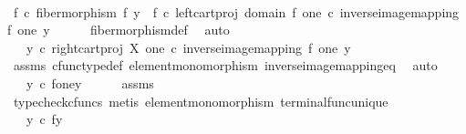 \begin{isabellebody}
%
\isatagproof
{}\isamarkupfalse%
\ {\isacharminus}{\kern0pt}\isanewline
\ \ \isamarkupfalse%
\ {\isachardoublequoteopen}f\ {\isasymcirc}\isactrlsub c\ fiber{\isacharunderscore}{\kern0pt}morphism\ f\ y\ {\isacharequal}{\kern0pt}\ f\ {\isasymcirc}\isactrlsub c\ left{\isacharunderscore}{\kern0pt}cart{\isacharunderscore}{\kern0pt}proj\ {\isacharparenleft}{\kern0pt}domain\ f{\isacharparenright}{\kern0pt}\ one\ {\isasymcirc}\isactrlsub c\ inverse{\isacharunderscore}{\kern0pt}image{\isacharunderscore}{\kern0pt}mapping\ f\ one\ y{\isachardoublequoteclose}\isanewline
\ \ \ \ \isamarkupfalse%
\ fiber{\isacharunderscore}{\kern0pt}morphism{\isacharunderscore}{\kern0pt}def\ \isamarkupfalse%
\ auto\isanewline
\ \ \isamarkupfalse%
\ \isamarkupfalse%
\ {\isachardoublequoteopen}{\isachardot}{\kern0pt}{\isachardot}{\kern0pt}{\isachardot}{\kern0pt}\ {\isacharequal}{\kern0pt}\ y\ {\isasymcirc}\isactrlsub c\ right{\isacharunderscore}{\kern0pt}cart{\isacharunderscore}{\kern0pt}proj\ X\ one\ {\isasymcirc}\isactrlsub c\ inverse{\isacharunderscore}{\kern0pt}image{\isacharunderscore}{\kern0pt}mapping\ f\ one\ y{\isachardoublequoteclose}\isanewline
\ \ \ \ \isamarkupfalse%
\ assms\ cfunc{\isacharunderscore}{\kern0pt}type{\isacharunderscore}{\kern0pt}def\ element{\isacharunderscore}{\kern0pt}monomorphism\ inverse{\isacharunderscore}{\kern0pt}image{\isacharunderscore}{\kern0pt}mapping{\isacharunderscore}{\kern0pt}eq\ \isamarkupfalse%
\ auto\isanewline
\ \ \isamarkupfalse%
\ \isamarkupfalse%
\ {\isachardoublequoteopen}{\isachardot}{\kern0pt}{\isachardot}{\kern0pt}{\isachardot}{\kern0pt}\ {\isacharequal}{\kern0pt}\ y\ {\isasymcirc}\isactrlsub c\ {\isasymbeta}\isactrlbsub f\isactrlsup {\isacharminus}{\kern0pt}one{\isasymrparr}\isactrlbsub y\isactrlesub \isactrlesub {\isachardoublequoteclose}\isanewline
\ \ \ \ \isamarkupfalse%
\ assms\ \isamarkupfalse%
\ {\isacharparenleft}{\kern0pt}typecheck{\isacharunderscore}{\kern0pt}cfuncs{\isacharcomma}{\kern0pt}\ metis\ element{\isacharunderscore}{\kern0pt}monomorphism\ terminal{\isacharunderscore}{\kern0pt}func{\isacharunderscore}{\kern0pt}unique{\isacharparenright}{\kern0pt}\isanewline
\ \ \isamarkupfalse%
\ \isamarkupfalse%
\ {\isachardoublequoteopen}{\isachardot}{\kern0pt}{\isachardot}{\kern0pt}{\isachardot}{\kern0pt}\ {\isacharequal}{\kern0pt}\ y\ {\isasymcirc}\isactrlsub c\ {\isasymbeta}\isactrlbsub f\isactrlsup {\isacharminus}{\kern0pt}y{\isacharbraceright}{\kern0pt}\isactrlesub {\isachardoublequoteclose}\isanewline

\end{isabellebody}
